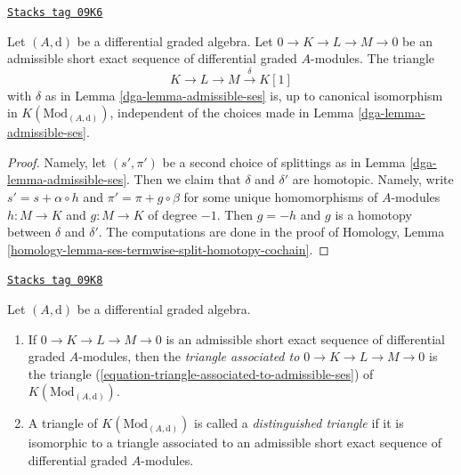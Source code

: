 \begin{lemma}
\label{dga-lemma-triangle-independent-splittings}
\href{https://stacks.math.columbia.edu/tag/09K6}{\texttt{Stacks tag 09K6}}

Let $(A, \text{d})$ be a differential graded algebra. Let
$0 \to K \to L \to M \to 0$ be an admissible short exact sequence
of differential graded $A$-modules. The triangle
\begin{equation}
\label{equation-triangle-associated-to-admissible-ses}
K \to L \to M \xrightarrow{\delta} K[1]
\end{equation}
with $\delta$ as in Lemma \ref{dga-lemma-admissible-ses} is, up to canonical
isomorphism in $K(\text{Mod}_{(A, \text{d})})$, independent of the choices
made in Lemma \ref{dga-lemma-admissible-ses}.
\end{lemma}

\begin{proof}

Namely, let $(s', \pi')$ be a second choice of splittings as in
Lemma \ref{dga-lemma-admissible-ses}. Then we claim that $\delta$ and $\delta'$
are homotopic. Namely, write $s' = s + \alpha \circ h$ and
$\pi' = \pi + g \circ \beta$ for some unique homomorphisms
of $A$-modules $h : M \to K$ and $g : M \to K$ of degree $-1$.
Then $g = -h$ and $g$ is a homotopy between $\delta$ and $\delta'$.
The computations are done in the proof of
Homology, Lemma \ref{homology-lemma-ses-termwise-split-homotopy-cochain}.
\end{proof}

\begin{definition}
\label{dga-definition-distinguished-triangle}
\href{https://stacks.math.columbia.edu/tag/09K8}{\texttt{Stacks tag 09K8}}

Let $(A, \text{d})$ be a differential graded algebra.
\begin{enumerate}
\item If $0 \to K \to L \to M \to 0$ is an admissible short exact sequence
of differential graded $A$-modules, then the {\it triangle associated
to $0 \to K \to L \to M \to 0$} is the triangle
(\ref{equation-triangle-associated-to-admissible-ses})
of $K(\text{Mod}_{(A, \text{d})})$.
\item A triangle of $K(\text{Mod}_{(A, \text{d})})$ is called a
{\it distinguished triangle} if it is isomorphic to a triangle
associated to an admissible short exact sequence
of differential graded $A$-modules.
\end{enumerate}
\end{definition}

